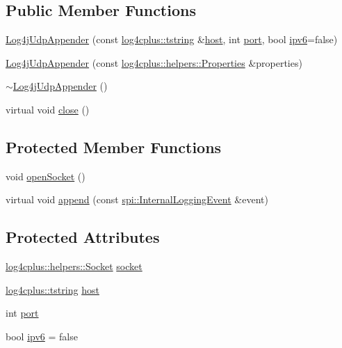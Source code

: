 \subsection*{Public Member Functions}
\begin{DoxyCompactItemize}
\item 
\hyperlink{classlog4cplus_1_1Log4jUdpAppender_a2a944eefe5bc4add7438987c4b4c76fe}{Log4j\-Udp\-Appender} (const \hyperlink{namespacelog4cplus_a3c9287f6ebcddc50355e29d71152117b}{log4cplus\-::tstring} \&\hyperlink{classlog4cplus_1_1Log4jUdpAppender_a198aeab5fafab8814d17c489e9243722}{host}, int \hyperlink{classlog4cplus_1_1Log4jUdpAppender_aa096edcccceef2fcf8af241acf86fe8c}{port}, bool \hyperlink{classlog4cplus_1_1Log4jUdpAppender_a71b6b31bcf31c3b7285c2cfc6248bfad}{ipv6}=false)
\item 
\hyperlink{classlog4cplus_1_1Log4jUdpAppender_a65e191302797b8b240071cbd59c2cf19}{Log4j\-Udp\-Appender} (const \hyperlink{classlog4cplus_1_1helpers_1_1Properties}{log4cplus\-::helpers\-::\-Properties} \&properties)
\item 
\hyperlink{classlog4cplus_1_1Log4jUdpAppender_a52b1f2a0f954fc0530f257db16bcd891}{$\sim$\-Log4j\-Udp\-Appender} ()
\item 
virtual void \hyperlink{classlog4cplus_1_1Log4jUdpAppender_a998d8bb6264a057c03ecd98f54a95e99}{close} ()
\end{DoxyCompactItemize}
\subsection*{Protected Member Functions}
\begin{DoxyCompactItemize}
\item 
void \hyperlink{classlog4cplus_1_1Log4jUdpAppender_aa53414d42330c2ad8a47006ea0468c23}{open\-Socket} ()
\item 
virtual void \hyperlink{classlog4cplus_1_1Log4jUdpAppender_a06301434134f7f745f9730be28cf01c4}{append} (const \hyperlink{classlog4cplus_1_1spi_1_1InternalLoggingEvent}{spi\-::\-Internal\-Logging\-Event} \&event)
\end{DoxyCompactItemize}
\subsection*{Protected Attributes}
\begin{DoxyCompactItemize}
\item 
\hyperlink{classlog4cplus_1_1helpers_1_1Socket}{log4cplus\-::helpers\-::\-Socket} \hyperlink{classlog4cplus_1_1Log4jUdpAppender_a8c7715d8dfd8e1e6bd2a5f4a355a521a}{socket}
\item 
\hyperlink{namespacelog4cplus_a3c9287f6ebcddc50355e29d71152117b}{log4cplus\-::tstring} \hyperlink{classlog4cplus_1_1Log4jUdpAppender_a198aeab5fafab8814d17c489e9243722}{host}
\item 
int \hyperlink{classlog4cplus_1_1Log4jUdpAppender_aa096edcccceef2fcf8af241acf86fe8c}{port}
\item 
bool \hyperlink{classlog4cplus_1_1Log4jUdpAppender_a71b6b31bcf31c3b7285c2cfc6248bfad}{ipv6} = false
\end{DoxyCompactItemize}
